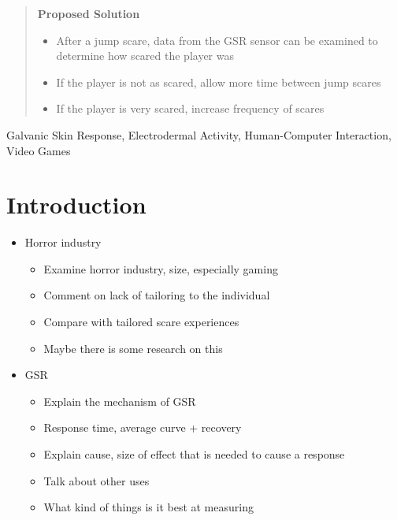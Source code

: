 \documentclass[12pt,a4paper]{article}
\begin{document}
\begin{abstract}
\textbf{Proposed Solution}
	\begin{itemize}
			\item After a jump scare, data from the GSR sensor can be examined to determine how scared the player was
			\item If the player is not as scared, allow more time between jump scares
			\item If the player is very scared, increase frequency of scares
	\end{itemize}

\end{abstract}

\begin{keywords}
Galvanic Skin Response, Electrodermal Activity, Human-Computer Interaction, Video Games
\end{keywords}

\section{Introduction}


	\begin{itemize}
		\item Horror industry
		\begin{itemize}
			\item Examine horror industry, size, especially gaming
			\item Comment on lack of tailoring to the individual
			\item Compare with tailored scare experiences
			\item Maybe there is some research on this
		\end{itemize}
	
		\item GSR
		\begin{itemize}
			\item Explain the mechanism of GSR
			\item Response time, average curve + recovery
			\item Explain cause, size of effect that is needed to cause a response
			\item Talk about other uses
			\item What kind of things is it best at measuring
		\end{itemize}
	\end{itemize}
\end{document}
